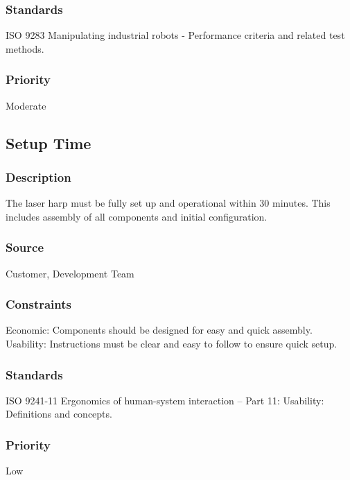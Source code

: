 \subsubsection{Standards}
ISO 9283 Manipulating industrial robots - Performance criteria and related test methods.
\subsubsection{Priority}
Moderate


\subsection{Setup Time}
\subsubsection{Description}
The laser harp must be fully set up and operational within 30 minutes. This includes assembly of all components and initial configuration.
\subsubsection{Source}
Customer, Development Team
\subsubsection{Constraints}
Economic: Components should be designed for easy and quick assembly.\\
Usability: Instructions must be clear and easy to follow to ensure quick setup.
\subsubsection{Standards}
ISO 9241-11 Ergonomics of human-system interaction – Part 11: Usability: Definitions and concepts.
\subsubsection{Priority}
Low
